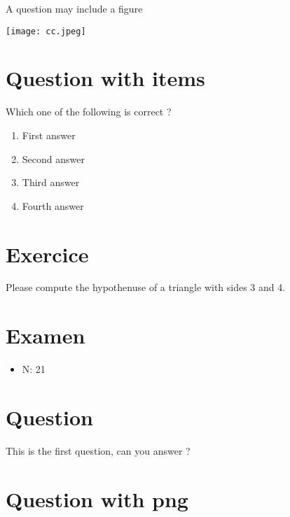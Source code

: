 \documentclass[a4paper,11pt,twoside]{article}
\begin{document}
A question may include a figure

\begin{center}
\texttt{[image: cc.jpeg]}
\end{center}



\section*{Question with items}
\label{sec:org1209f37}

Which one of the following is correct ?

\begin{enumerate}
\item First answer
\item Second answer
\item Third answer
\item Fourth answer
\end{enumerate}



\section*{Exercice}
\label{sec:orga71b138}

Please compute the hypothenuse of a triangle with sides 3 and 4.



\subsection*{}
\label{sec:org288cdd5}

\cleardoublepage

\section*{Examen}
\label{sec:org354f39b}
\begin{itemize}
\item N: 21
\end{itemize}
\section*{Question}
\label{sec:org0cdaeed}

This is the first question, can you answer ?



\section*{Question with png}
\label{sec:orgf99df34}
\end{document}
